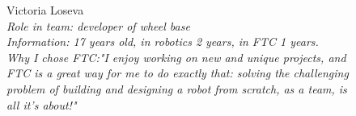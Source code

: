 \begin{figure}[H]	
	\begin{minipage}{0.47\linewidth}
		Victoria Loseva\\
		\emph{Role in team: developer of wheel base\\ }
		\emph{Information: 17 years old, in robotics 2 years, in FTC 1 years. \\} 
		\emph{Why I chose FTC:"I enjoy working on new and unique projects, and FTC is a great way for me to do exactly that: solving the challenging problem of building and designing a robot from scratch, as a team, is all it's about!"}			
	\end{minipage}	
	\hfill
	\begin{minipage}{0.47\linewidth}
	\end{minipage}
\end{figure}
\fillpage


